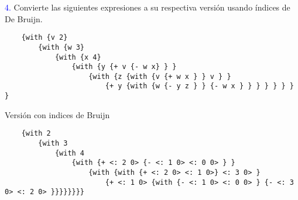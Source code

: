 {\textcolor{blue}{4.}} Convierte las siguientes expresiones a su respectiva versión usando índices de De Bruijn.

\begin{lstlisting}
    {with {v 2}
        {with {w 3}
            {with {x 4}
                {with {y {+ v {- w x} } }
                    {with {z {with {v {+ w x } } v } }
                        {+ y {with {w {- y z } } {- w x } } } } } } } }
\end{lstlisting} 

Versión con indices de Bruijn
\begin{lstlisting}
    {with 2
        {with 3
            {with 4
                {with {+ <: 2 0> {- <: 1 0> <: 0 0> } }
                    {with {with {+ <: 2 0> <: 1 0>} <: 3 0> }
                        {+ <: 1 0> {with {- <: 1 0> <: 0 0> } {- <: 3 0> <: 2 0> }}}}}}}}
\end{lstlisting} 
